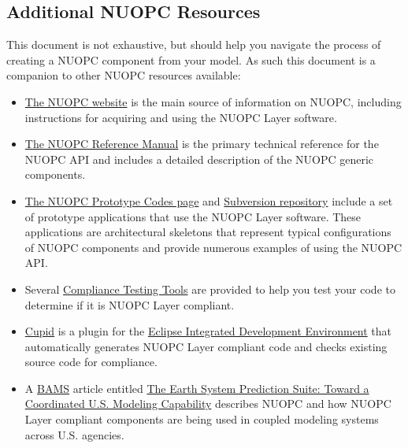 \subsection{Additional NUOPC Resources}
This document is not exhaustive, but should help you navigate the process of creating
a NUOPC component from your model.  As such this document is a companion to other NUOPC 
resources available:
\begin{itemize}
\item \href{https://www.earthsystemcog.org/projects/nuopc}{The NUOPC website}
is the main source of information on NUOPC, including instructions
for acquiring and using the NUOPC Layer software.

\item \href{https://www.earthsystemcog.org/projects/nuopc/refmans}{The NUOPC Reference Manual}
is the primary technical reference for the NUOPC API and includes
a detailed description of the NUOPC generic components.

\item \href{https://www.earthsystemcog.org/projects/nuopc/proto\_codes}{The NUOPC Prototype Codes page}
and \href{https://sourceforge.net/p/esmfcontrib/svn/HEAD/tree/NUOPC/tags/ESMF\_7\_0\_0/}{Subversion repository}
include a set of prototype applications that use the NUOPC Layer software. These
applications are architectural skeletons that represent typical
configurations of NUOPC components and provide numerous examples
of using the NUOPC API.

\item Several \href{https://www.earthsystemcog.org/projects/nuopc/compliance\_testing}{Compliance Testing Tools}
are provided to help you test your code to determine if it is NUOPC Layer compliant.

\item \href{https://www.earthsystemcog.org/projects/cupid/}{Cupid}
is a plugin for the \href{https://eclipse.org/}{Eclipse Integrated Development Environment}
that automatically generates NUOPC Layer compliant code and checks existing
source code for compliance.

\item A \href{https://www2.ametsoc.org/ams/index.cfm/publications/bulletin-of-the-american-meteorological-society-bams/}{BAMS}
article entitled \href{http://journals.ametsoc.org/doi/abs/10.1175/BAMS-D-14-00164.1}{The Earth System Prediction Suite: Toward a Coordinated U.S. Modeling Capability}
describes NUOPC and how NUOPC Layer compliant components are being used in coupled modeling
systems across U.S. agencies.

\end{itemize}

